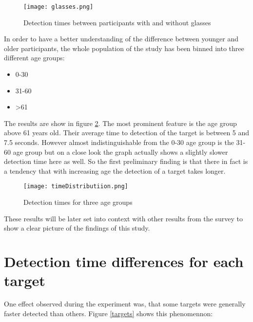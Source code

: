             \begin{figure}[h]     %
                \centering
                \texttt{[image: glasses.png]} 
                \caption{Detection times between participants with and without glasses}\label{glasses}
            \end{figure}

            In order to have a better understanding of the difference between younger and older participants, the whole population of the study has been binned into three different age groups:

            \begin{itemize}
                \item 0-30
                \item 31-60
                \item >61
            \end{itemize}

            The results are show in figure \ref*{age-groups}. The most prominent feature is the age group above 61 years old. Their average time to detection of the target is between 5 and 7.5 seconds. However almost indistinguishable from the 0-30 age group is the 31-60 age group but on a close look the graph actually shows a slightly slower detection time here as well. So the first preliminary finding is that there in fact is a tendency that with increasing age the detection of a target takes longer.

            \begin{figure}[h]     %
                \centering
                \texttt{[image: timeDistributiion.png]} 
                \caption{Detection times for three age groups}\label{age-groups}
            \end{figure}

            These results will be later set into context with other results from the survey to show a clear picture of the findings of this study.

        \section{Detection time differences for each target}

            One effect observed during the experiment was, that some targets were generally faster detected than others. Figure \ref*{targets} shows this phenomennon:

